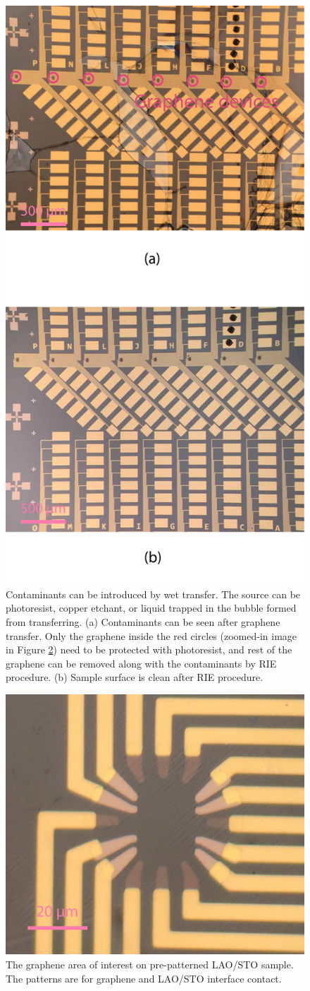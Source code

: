 \documentclass[pdflatex, sectionletters, 12pt]{pittetd}    %
\begin{document}
\begin{figure}[p]
	\centering
	\includegraphics[width=.55\textwidth]{Drawing/SampleContaminant.pdf}
	\caption{Contaminants can be introduced by wet transfer. The source can be photoresist, copper etchant, or liquid trapped in the bubble formed from transferring. (a) Contaminants can be seen after graphene transfer. Only the graphene inside the red circles (zoomed-in image in Figure \ref{FIG:RIEBeforeEtching}) need to be protected with photoresist, and rest of the graphene can be removed along with the contaminants by RIE procedure. (b) Sample surface is clean after RIE procedure.}
	\label{FIG:SampleContaminant}
\end{figure}

\begin{figure}[h!]
	\centering
	\includegraphics[width=.5\textwidth]{Drawing/RIEBeforeEtching.pdf}
	\caption{The graphene area of interest on pre-patterned LAO/STO sample. The patterns are for graphene and LAO/STO interface contact.}
	\label{FIG:RIEBeforeEtching}
\end{figure}
\end{document}

